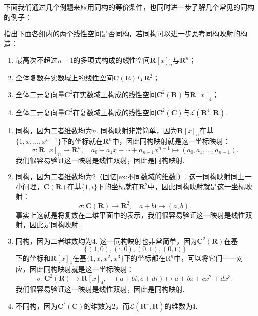 下面我们通过几个例题来应用同构的等价条件，也同时进一步了解几个常见的同构的例子：
\begin{example}{}{}
    指出下面各组内的两个线性空间是否同构，若同构可以进一步思考同构映射的构造：
    \begin{enumerate}
        \item 最高次不超过$n-1$的多项式构成的线性空间$\mathbf{R}[x]_n$与$\mathbf{R}^n$；

        \item 全体复数在实数域上的线性空间$\mathbf{C}(\mathbf{R})$与$\mathbf{R}^2$；

        \item 全体二元复向量$\mathbf{C}^2$在实数域上构成的线性空间$\mathbf{C}^2(\mathbf{R})$与$\mathbf{R}[x]_4$；

        \item 全体二元复向量$\mathbf{C}^2$在复数域上构成的线性空间$\mathbf{C}^2(\mathbf{C})$与$\mathcal{L}(\mathbf{R}^4,\mathbf{R})$.
    \end{enumerate}
\end{example}

\begin{solution}
    \begin{enumerate}
        \item 同构，因为二者维数均为$n$. 同构映射非常简单，因为$\mathbf{R}[x]_n$在基$\{1,x,\ldots,x^{n-1}\}$下的坐标就在$\mathbf{R}^n$中，因此同构映射就是这一坐标映射：
              \[\sigma:\mathbf{R}[x]_n\to\mathbf{R}^n,\quad a_0+a_1x+\cdots+a_{n-1}x^{n-1}\mapsto(a_0,a_1,\ldots,a_{n-1}).\]
              我们很容易验证这一映射是线性双射，因此是同构映射.

        \item 同构，因为二者维数均为2（回忆\autoref{ex:不同数域的维数}）. 这一同构映射同上一小问理，$\mathbf{C}(\mathbf{R})$在基$\{1,i\}$下的坐标就在$\mathbf{R}^2$中，因此同构映射就是这一坐标映射：
              \[\sigma:\mathbf{C}(\mathbf{R})\to\mathbf{R}^2,\quad a+b\mathrm{i}\mapsto(a,b).\]
              事实上这就是将复数在二维平面中的表示，我们很容易验证这一映射是线性双射，因此是同构映射..

        \item 同构，因为二者维数均为4. 这一同构映射也非常简单，因为$\mathbf{C}^2(\mathbf{R})$在基
              \[\{(1,0),(\mathrm{i},0),(0,1),(0,\mathrm{i})\}\]
              下的坐标和$\mathbf{R}[x]_4$在基$\{1,x,x^2,x^3\}$下的坐标都在$\mathrm{R}^n$中，可以将它们一一对应，因此同构映射就是这一坐标映射：
              \[\sigma:\mathbf{C}^2(\mathbf{R})\to\mathbf{R}[x]_4,\quad (a+bi,c+di)\mapsto a+bx+cx^2+dx^3.\]
              我们很容易验证这一映射是线性双射，因此是同构映射.

        \item 不同构，因为$\mathbf{C}^2(\mathbf{C})$的维数为2，而$\mathcal{L}(\mathbf{R}^4,\mathbf{R})$的维数为4.
    \end{enumerate}
\end{solution}

